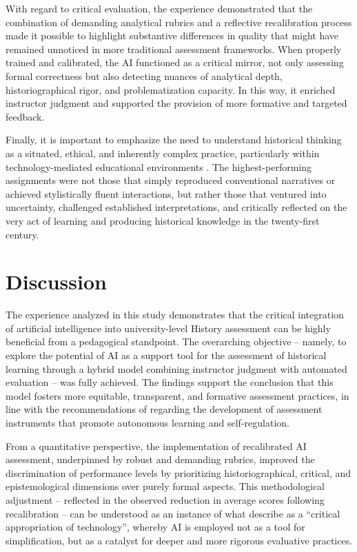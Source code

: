 \documentclass[english]{textolivre}
\begin{document}
With regard to critical evaluation, the experience demonstrated that the combination of demanding analytical rubrics and a reflective recalibration process made it possible to highlight substantive differences in quality that might have remained unnoticed in more traditional assessment frameworks. When properly trained and calibrated, the AI functioned as a critical mirror, not only assessing formal correctness but also detecting nuances of analytical depth, historiographical rigor, and problematization capacity. In this way, it enriched instructor judgment and supported the provision of more formative and targeted feedback.

Finally, it is important to emphasize the need to understand historical thinking as a situated, ethical, and inherently complex practice, particularly within technology-mediated educational environments \cite{alvarez2023, carrasco2024, tirado2023}. The highest-performing assignments were not those that simply reproduced conventional narratives or achieved stylistically fluent interactions, but rather those that ventured into uncertainty, challenged established interpretations, and critically reflected on the very act of learning and producing historical knowledge in the twenty-first century.

\section{Discussion}

The experience analyzed in this study demonstrates that the critical integration of artificial intelligence into university-level History assessment can be highly beneficial from a pedagogical standpoint. The overarching objective -- namely, to explore the potential of AI as a support tool for the assessment of historical learning through a hybrid model combining instructor judgment with automated evaluation -- was fully achieved. The findings support the conclusion that this model fosters more equitable, transparent, and formative assessment practices, in line with the recommendations of \textcite{panadero2013} regarding the development of assessment instruments that promote autonomous learning and self-regulation.

From a quantitative perspective, the implementation of recalibrated AI assessment, underpinned by robust and demanding rubrics, improved the discrimination of performance levels by prioritizing historiographical, critical, and epistemological dimensions over purely formal aspects. This metho\-dological adjustment -- reflected in the observed reduction in average scores following recalibration -- can be understood as an instance of what \textcite[p. 6, 11-12]{holmes2019} describe as a ``critical appropriation of technology'', whereby AI is employed not as a tool for simplification, but as a catalyst for deeper and more rigorous evaluative practices.
\end{document}
